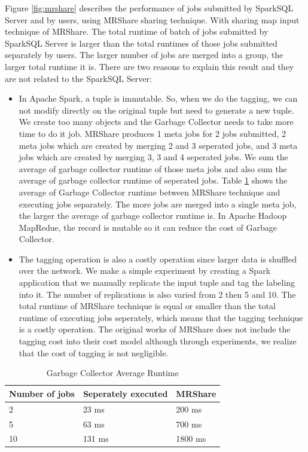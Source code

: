 Figure \ref{fig:mrshare} describes the performance of jobs submitted by SparkSQL Server and by users, using MRShare sharing technique. With sharing map input technique of MRShare. The total runtime of batch of jobs submitted by SparkSQL Server is larger than the total runtimes of those jobs submitted separately by users. The larger number of jobs are merged into a group, the larger total runtime it is. There are two reasons to explain this result and they are not related to the SparkSQL Server:\\
\begin{itemize}
\item In Apache Spark, a tuple  is immutable. So, when we do the tagging, we can not modify directly on the original tuple but need to generate a new tuple. We create too many objects and the Garbage Collector needs to take more time to do it job. MRShare produces 1 meta jobs for 2 jobs submitted, 2 meta jobs which are created by merging 2 and 3 seperated jobs, and 3 meta jobs which are created by merging 3, 3 and 4 seperated jobs. We sum the average of garbage collector runtime of those meta jobs and also sum the average of garbage collector runtime of seperated jobs. Table \ref{gc-runtime} shows the average of Garbage Collector runtime between MRShare technique and executing jobs separately. The more jobs are merged into a single meta job, the larger the average of garbage collector runtime is. In Apache Hadoop MapRedue, the record is mutable so it can reduce the cost of Garbage Collector.
\item The tagging operation is also a costly operation since larger data is shuffled over the network. We make a simple experiment by creating a Spark application that we manually replicate the input tuple and tag the labeling into it. The number of replications is also varied from 2 then 5 and 10. The total runtime of MRShare technique is equal or smaller than the total runtime of executing jobs seperately, which means that the tagging technique is a costly operation. The original works of MRShare does not include the tagging cost into their cost model although through experiments, we realize that the cost of tagging is not negligible.
\end{itemize}

\begin{table}[]
\centering
\caption{Garbage Collector Average Runtime}
\label{gc-runtime}
\begin{tabular}{|l|l|l|}
\hline
Number of jobs & Seperately executed & MRShare \\ \hline
2              & 23 ms                  & 200 ms    \\ \hline
5              & 63 ms                  & 700 ms    \\ \hline
10             & 131 ms                 & 1800 ms   \\ \hline
\end{tabular}
\end{table}


